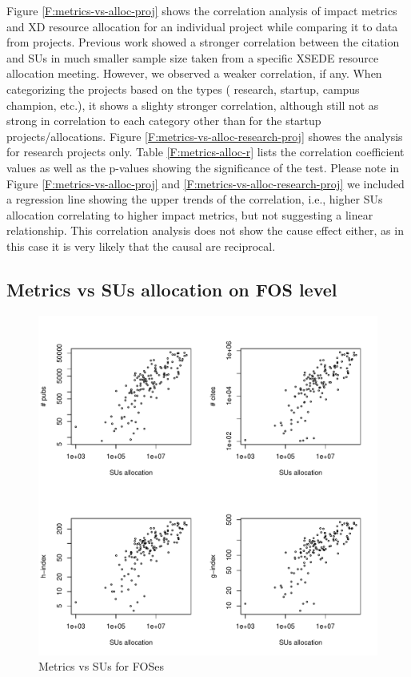 \documentclass{sig-alternate}
\begin{document}
Figure \ref{F:metrics-vs-alloc-proj} shows the correlation analysis of impact metrics and XD resource allocation for an individual project while comparing it to  data from projects. Previous work showed a stronger correlation between the citation and SUs \cite{bollen2011and} in much smaller sample size taken from a specific XSEDE resource allocation meeting. However, we observed a weaker correlation, if any. When categorizing the projects based on the types ( research, startup, campus champion, etc.), it shows a slighty stronger correlation,  although still not as strong in correlation to each category other than for the startup projects/allocations. Figure \ref{F:metrics-vs-alloc-research-proj} showes the analysis for research projects only. Table \ref{F:metrics-alloc-r} lists the correlation coefficient values as well as the p-values showing the significance of the test. Please note in Figure \ref{F:metrics-vs-alloc-proj} and \ref{F:metrics-vs-alloc-research-proj} we included a regression line showing the upper trends of the correlation, i.e., higher SUs allocation correlating to higher impact metrics, but not suggesting a linear relationship. This correlation analysis does not show the cause effect either, as in this case it is very likely that the causal are reciprocal. 
 
\subsection{Metrics vs SUs allocation on FOS level} 
 
\begin{figure}[htb] 
  \centering 
    \includegraphics[width=1.0\columnwidth]{images/03_metrics_vs_alloc_fos.pdf} 
  \caption{Metrics vs SUs for FOSes}\label{F:metrics-vs-alloc-fos} 
\end{figure} 
\end{document}
